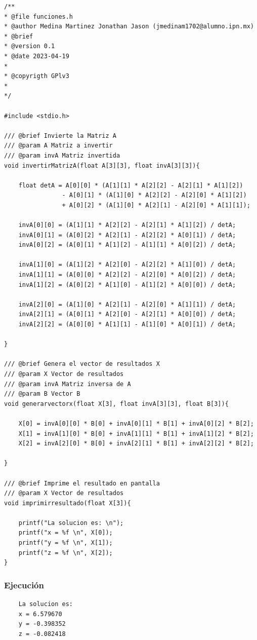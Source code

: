 \documentclass{article}
\begin{document}
	\begin{lstlisting}
/**
* @file funciones.h
* @author Medina Martinez Jonathan Jason (jmedinam1702@alumno.ipn.mx)
* @brief 
* @version 0.1
* @date 2023-04-19
* 
* @copyrigth GPlv3
* 
*/

#include <stdio.h>

/// @brief Invierte la Matriz A
/// @param A Matriz a invertir
/// @param invA Matriz invertida
void invertirMatrizA(float A[3][3], float invA[3][3]){
	
	float detA = A[0][0] * (A[1][1] * A[2][2] - A[2][1] * A[1][2])
				- A[0][1] * (A[1][0] * A[2][2] - A[2][0] * A[1][2])
				+ A[0][2] * (A[1][0] * A[2][1] - A[2][0] * A[1][1]);
	
	invA[0][0] = (A[1][1] * A[2][2] - A[2][1] * A[1][2]) / detA;
	invA[0][1] = (A[0][2] * A[2][1] - A[2][2] * A[0][1]) / detA;
	invA[0][2] = (A[0][1] * A[1][2] - A[1][1] * A[0][2]) / detA;
	
	invA[1][0] = (A[1][2] * A[2][0] - A[2][2] * A[1][0]) / detA;
	invA[1][1] = (A[0][0] * A[2][2] - A[2][0] * A[0][2]) / detA;
	invA[1][2] = (A[0][2] * A[1][0] - A[1][2] * A[0][0]) / detA;
	
	invA[2][0] = (A[1][0] * A[2][1] - A[2][0] * A[1][1]) / detA;
	invA[2][1] = (A[0][1] * A[2][0] - A[2][1] * A[0][0]) / detA;
	invA[2][2] = (A[0][0] * A[1][1] - A[1][0] * A[0][1]) / detA;
	
}

/// @brief Genera el vector de resultados X
/// @param X Vector de resultados
/// @param invA Matriz inversa de A
/// @param B Vector B
void generarvectorx(float X[3], float invA[3][3], float B[3]){
	
	X[0] = invA[0][0] * B[0] + invA[0][1] * B[1] + invA[0][2] * B[2];
	X[1] = invA[1][0] * B[0] + invA[1][1] * B[1] + invA[1][2] * B[2];
	X[2] = invA[2][0] * B[0] + invA[2][1] * B[1] + invA[2][2] * B[2];
	
}

/// @brief Imprime el resultado en pantalla
/// @param X Vector de resultados
void imprimirresultado(float X[3]){
	
	printf("La solucion es: \n");
	printf("x = %f \n", X[0]);
	printf("y = %f \n", X[1]);
	printf("z = %f \n", X[2]);
}
	\end{lstlisting}
	
	\subsubsection{Ejecución}
	
	\begin{lstlisting}
	La solucion es: 
	x = 6.579670 
	y = -0.398352 
	z = -0.082418 
	\end{lstlisting}
	
\end{document}
